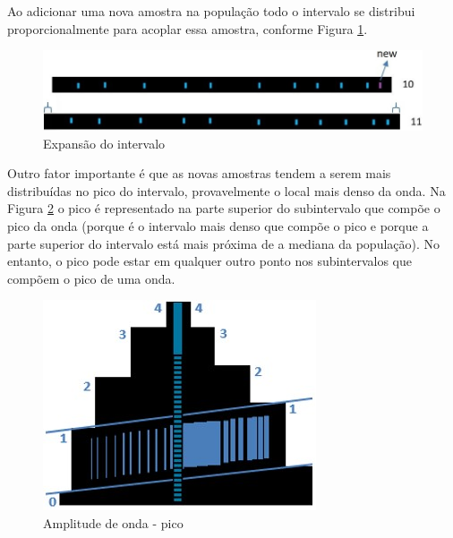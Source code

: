 Ao adicionar uma nova amostra na população todo o intervalo se distribui proporcionalmente para acoplar essa amostra, conforme Figura \ref{fig:consciousness_space_volume_amplitude}.
	\begin{figure}[H]
	\caption{Expansão do intervalo}
	\label{fig:consciousness_space_volume_amplitude}
	\centering
	\includegraphics[scale=.5]{sections/images/consciousness_space_volume_amplitude.jpg}
	\end{figure}

Outro fator importante é que as novas amostras tendem a serem mais distribuídas no pico do intervalo, provavelmente o local mais denso da onda. Na Figura \ref{fig:consciousness_space_amplitude_growth} o pico é representado na parte superior do subintervalo que compõe o pico da onda (porque é o intervalo mais denso que compõe o pico e porque a parte superior do intervalo está mais próxima de a mediana da população). No entanto, o pico pode estar em qualquer outro ponto nos subintervalos que compõem o pico de uma onda.
	\begin{figure}[H]
	\caption{Amplitude de onda - pico}
	\label{fig:consciousness_space_amplitude_growth}
	\centering
	\includegraphics[scale=.6]{sections/images/consciousness_space_amplitude_growth.jpg}
	\end{figure}

